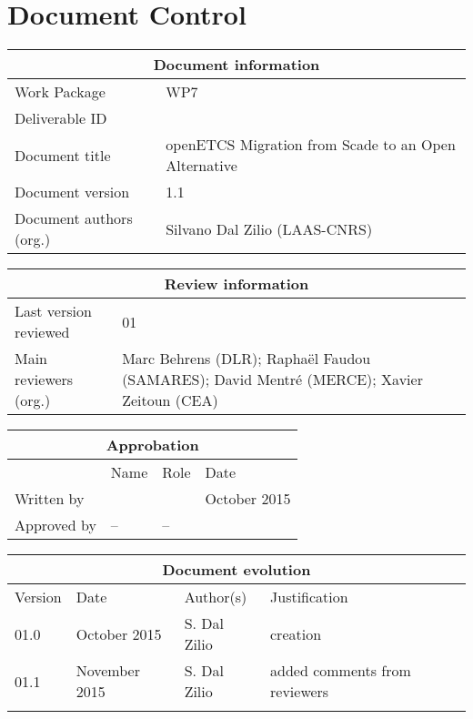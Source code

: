 \documentclass{template/openetcs_report}
\begin{document}
\maketitle
\tableofcontents
\newpage

\chapter{Document Control}

\begin{tabular}{|p{4.4cm}|p{8.7cm}|}
\hline
\multicolumn{2}{|c|}{Document information} \\
\hline
Work Package &  WP7  \\
Deliverable ID & \\
\hline
Document title & openETCS Migration from Scade to an Open Alternative \\
Document version & 1.1 \\
Document authors (org.)  & 

{Silvano Dal Zilio} (LAAS-CNRS)\\
\hline
\end{tabular}

\begin{tabular}{|p{4.4cm}|p{8.7cm}|}
\hline
\multicolumn{2}{|c|}{Review information} \\
\hline
Last version reviewed & 01 \\
\hline
Main reviewers (org.) &  {Marc Behrens} (DLR); Raphaël Faudou
                           (SAMARES); David Mentré (MERCE); Xavier
                           Zeitoun (CEA) \\
\hline
\end{tabular}

\begin{tabular}{|p{2.2cm}|p{4cm}|p{4cm}|p{2cm}|}
\hline
\multicolumn{4}{|c|}{Approbation} \\
\hline
  &  Name & Role & Date   \\
\hline  
Written by    &  &   &  October 2015\\
\hline
Approved by & -- & -- & \\
\hline
\end{tabular}

\begin{tabular}{|p{2.2cm}|p{2cm}|p{3cm}|p{5cm}|}
\hline
\multicolumn{4}{|c|}{Document evolution} \\
\hline
Version &  Date & Author(s) & Justification  \\
\hline
01.0 &  October 2015 & S. Dal Zilio  & creation \\
\hline  
01.1 &  November 2015 & S. Dal Zilio  & added comments from reviewers \\
\hline  
 & &  &   \\
\hline  
\end{tabular}
\newpage
\end{document}
